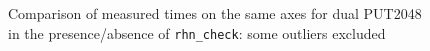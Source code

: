 \documentclass[10pt]{article}
\begin{document}
\begin{figure}[H]
{	}
	\caption{Comparison of measured times on the same axes for dual PUT2048 in the presence/absence of {\tt rhn\_check}: some outliers excluded~\label{fig:rhn_check_effect1}}
\end{figure}
\end{document}
